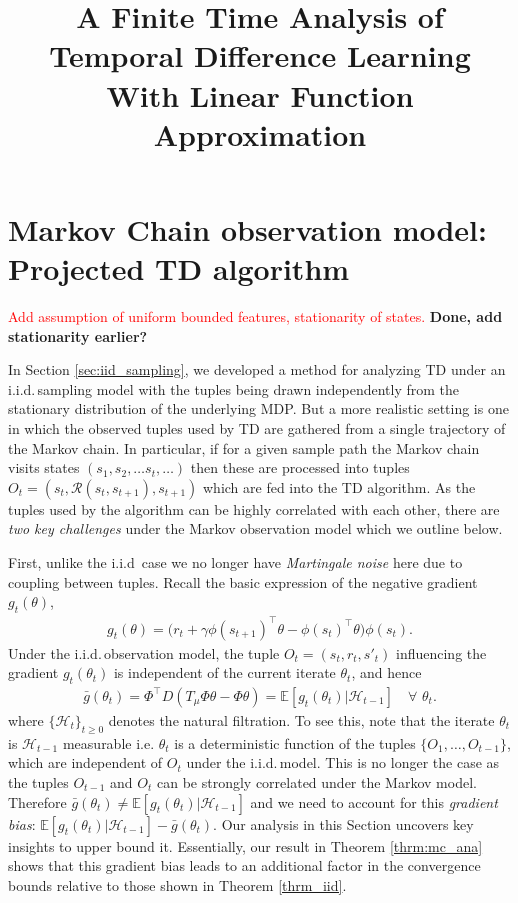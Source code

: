 \documentclass{colt2018} %
\title[Finite Time Analysis of TD]{A Finite Time Analysis of Temporal Difference Learning With Linear Function Approximation}
\newcommand{\Rc}{\mathcal{R}}
\def\jb#1{\textbf{\color{red}#1}}
\begin{document}
\maketitle

\section{Markov Chain observation model: Projected TD algorithm} \label{sec:markov_chain_analyis}
\textcolor{red}{Add assumption of uniform bounded features, stationarity of states.}
\jb{Done, add stationarity earlier?}

In Section \ref{sec:iid_sampling}, we developed a method for analyzing TD under an i.i.d.\,sampling model with the tuples being drawn independently from the stationary distribution of the underlying MDP. But a more realistic setting is one in which the observed tuples used by TD are gathered from a single trajectory of the Markov chain.  In particular, if for a given sample path the Markov chain visits states $(s_1, s_2,\ldots s_t, \ldots)$ then these are processed into tuples $O_t= (s_t, \Rc(s_t, s_{t+1}), s_{t+1})$ which are fed into the TD algorithm. As the tuples used by the algorithm can be highly correlated with each other, there are \emph{two key challenges} under the Markov observation model which we outline below.

First, unlike the i.i.d\, case we no longer have \emph{Martingale noise} here due to coupling between tuples. Recall the basic expression of the negative gradient $g_t(\theta)$,
\begin{eqnarray*}
g_t(\theta) = \Big( r_t + \gamma \phi(s_{t+1})^\top \theta - \phi(s_t)^\top \theta \Big) \phi(s_t).
\end{eqnarray*}
Under the i.i.d.\,observation model, the tuple $O_t=(s_t, r_t, s'_t)$ influencing the gradient $g_{t}(\theta_t)$ is independent of the current iterate $\theta_t$, and hence
\begin{eqnarray*}
\bar{g}(\theta_t) = \Phi^\top D (T_{\mu}\Phi\theta - \Phi \theta) = \mathbb{E} \left[ g_t(\theta_t) | \mathcal{H}_{t-1} \right] \quad \forall \,\, \theta_t.
\end{eqnarray*}
where $\{\mathcal{H}_t\}_{t \geq 0}$ denotes the natural filtration. To see this, note that the iterate $\theta_t$ is $\mathcal{H}_{t-1}$ measurable i.e. $\theta_t$ is a deterministic function of the tuples $\{O_1, \ldots, O_{t-1}\}$, which are independent of $O_t$ under the i.i.d.\,model. This is no longer the case as the tuples $O_{t-1}$ and $O_t$ can be strongly correlated under the Markov model. Therefore $\bar{g}(\theta_t) \neq \mathbb{E} \left[ g_t(\theta_t)|\mathcal{H}_{t-1} \right]$ and we need to account for this \emph{gradient bias}: $\mathbb{E} \left[ g_t(\theta_t)|\mathcal{H}_{t-1} \right] - \bar{g}(\theta_t)$. Our analysis in this Section uncovers key insights to upper bound it. Essentially, our result in Theorem \ref{thrm:mc_ana} shows that this gradient bias leads to an additional factor in the convergence bounds relative to those shown in Theorem \ref{thrm_iid}.
\end{document}
